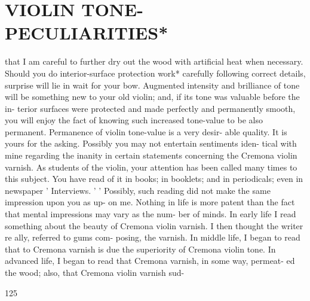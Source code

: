 \documentclass{article}
\begin{document}
\section*{VIOLIN TONE-PECULIARITIES*}
that I am careful to further dry out the wood with artificial heat when necessary. Should you do interior-surface protection work* carefully following correct details, surprise will lie in wait for your bow. Augmented intensity and brilliance of tone will be something new to your old violin; and, if its tone was valuable before the in- terior surfaces were protected and made perfectly and permanently smooth, you will enjoy the fact of knowing such increased tone-value to be also permanent. Permanence of violin tone-value is a very desir- able quality. It is yours for the asking. Possibly you may not entertain sentiments iden- tical with mine regarding the inanity in certain statements concerning the Cremona violin varnish. As students of the violin, your attention has been called many times to this subject. You have read of it in books; in booklets; and in periodicals; even in newspaper ' Interviews. ' ' Possibly, such reading did not make the same impression upon you as up- on me. Nothing in life is more patent than the fact that mental impressions may vary as the num- ber of minds. In early life I read something about the beauty of Cremona violin varnish. I then thought the writer re ally, referred to gums com- posing, the varnish. In middle life, I began to read that to Cremona varnish is due the superiority of Cremona violin tone. In advanced life, I began to read that Cremona varnish, in some way, permeat- ed the wood; also, that Cremona violin varnish sud-

125
\end{document}
